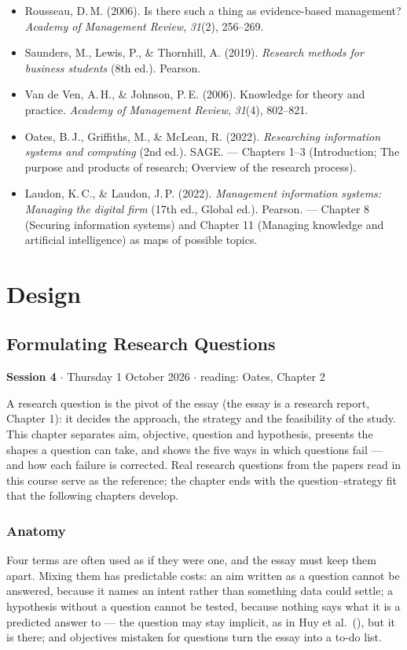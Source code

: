 \documentclass[11pt,a4paper,british,twoside=false,headings=small,chapterprefix=false,numbers=noenddot]{scrbook}
\newcommand{\sessionhead}[2]{\begin{tcolorbox}[enhanced, colback=uiamutedblue, colframe=uiamutedblue, arc=1.5pt, left=6pt, right=6pt]
  \small \textbf{Session #1} \;$\cdot$\; #2\end{tcolorbox}}
\begin{document}
\begin{itemize}
  \item Rousseau, D.\,M. (2006). Is there such a thing as evidence-based management? \emph{Academy of Management Review}, \emph{31}(2), 256--269.
  \item Saunders, M., Lewis, P., \& Thornhill, A. (2019). \emph{Research methods for business students} (8th ed.). Pearson.
  \item Van de Ven, A.\,H., \& Johnson, P.\,E. (2006). Knowledge for theory and practice. \emph{Academy of Management Review}, \emph{31}(4), 802--821.
  \item Oates, B.\,J., Griffiths, M., \& McLean, R. (2022). \emph{Researching information systems and computing} (2nd ed.). SAGE. --- Chapters 1--3 (Introduction; The purpose and products of research; Overview of the research process).
  \item Laudon, K.\,C., \& Laudon, J.\,P. (2022). \emph{Management information systems: Managing the digital firm} (17th ed., Global ed.). Pearson. --- Chapter 8 (Securing information systems) and Chapter 11 (Managing knowledge and artificial intelligence) as maps of possible topics.
\end{itemize}

\part{Design}
\chapter{Formulating Research Questions}
\label{ch:4}
\sessionhead{4}{Thursday 1 October 2026 \;$\cdot$\; reading: Oates, Chapter 2}

A research question is the pivot of the essay (the essay is a research report, Chapter 1): it decides the approach, the strategy and the feasibility of the study. This chapter separates aim, objective, question and hypothesis, presents the shapes a question can take, and shows the five ways in which questions fail --- and how each failure is corrected. Real research questions from the papers read in this course serve as the reference; the chapter ends with the question--strategy fit that the following chapters develop.


\section{Anatomy}

Four terms are often used as if they were one, and the essay must keep them apart. Mixing them has predictable costs: an aim written as a question cannot be answered, because it names an intent rather than something data could settle; a hypothesis without a question cannot be tested, because nothing says what it is a predicted answer to --- the question may stay implicit, as in Huy et al.\ (), but it is there; and objectives mistaken for questions turn the essay into a to-do list.
\end{document}
